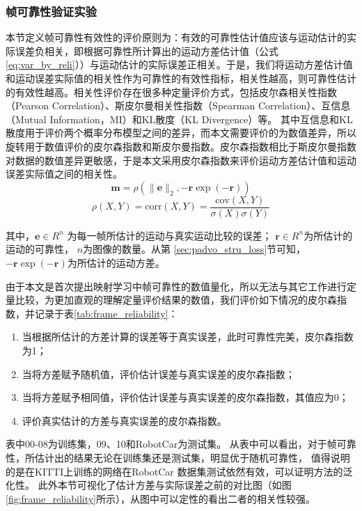 \subsubsection{帧可靠性验证实验}
本节定义帧可靠性有效性的评价原则为：有效的可靠性估计值应该与运动估计的实际误差负相关，即根据可靠性所计算出的运动方差估计值（公式\eqref{eq:var_by_reli}））与运动估计的实际误差正相关。于是，我们将运动方差估计值和运动误差实际值的相关性作为可靠性的有效性指标，相关性越高，则可靠性估计的有效性越高。相关性评价存在很多种定量评价方式，包括皮尔森相关性指数（Pearson Correlation）、斯皮尔曼相关性指数（Spearman Correlation）、互信息（Mutual Information，MI）和KL散度（KL Divergence）等。
其中互信息和KL散度用于评价两个概率分布模型之间的差异，而本文需要评价的为数值差异，所以旋转用于数值评价的皮尔森指数和斯皮尔曼指数。皮尔森指数相比于斯皮尔曼指数对数据的数值差异更敏感，于是本文采用皮尔森指数来评价运动方差估计值和运动误差实际值之间的相关性。
\begin{equation}
  \label{eq:re}
  \mathbf{m} = \rho\left({\|\mathbf{e}\|_2},{-\mathbf{r}\exp(-\mathbf{r})}\right)
\end{equation}
\begin{equation}
  \rho(X,Y) =\text{corr}(X,Y)= \frac{\text{cov}(X,Y)}{\sigma(X)\sigma(Y)}
\end{equation}

其中，$\mathbf{e} \in R^{n}$ 为每一帧所估计的运动与真实运动比较的误差；
 $\mathbf{r} \in R^{n}$为所估计的运动的可靠性，
$n$为图像的数量。从第
\ref{sec:padvo_stru_loss}节可知，$-\mathbf{r}\exp(-\mathbf{r})$为所估计的运动方差。

由于本文是首次提出映射学习中帧可靠性的数值量化，所以无法与其它工作进行定量比较，为更加直观的理解定量评价结果的数值，我们评价如下情况的皮尔森指数，并记录于表\ref{tab:frame_reliability}：
\begin{enumerate}
  \item 当根据所估计的方差计算的误差等于真实误差，此时可靠性完美，皮尔森指数为1；
  \item 当将方差赋予随机值，评价估计误差与真实误差的皮尔森指数；
  \item 当将方差赋予相同值，评价估计误差与真实误差的皮尔森指数，其值应为0；
  \item 评价真实估计的方差与真实误差的皮尔森指数。
\end{enumerate}

表中00-08为训练集，09、10和RobotCar为测试集。
从表中可以看出，对于帧可靠性，所估计出的结果无论在训练集还是测试集，明显优于随机可靠性，
值得说明的是在KITTI上训练的网络在RobotCar
数据集测试依然有效，可以证明方法的泛化性。
此外本节可视化了估计方差与实际误差之前的对比图（如图\ref{fig:frame_reliability}所示），从图中可以定性的看出二者的相关性较强。

